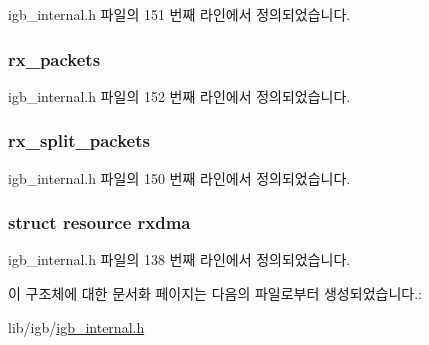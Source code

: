 igb\+\_\+internal.\+h 파일의 151 번째 라인에서 정의되었습니다.

\subsubsection[{\texorpdfstring{rx\+\_\+packets}{rx_packets}}]{ rx\+\_\+packets}\hypertarget{structrx__ring_aa3bebfb174ded875865a321225aa30ac}{}\label{structrx__ring_aa3bebfb174ded875865a321225aa30ac}


igb\+\_\+internal.\+h 파일의 152 번째 라인에서 정의되었습니다.

\subsubsection[{\texorpdfstring{rx\+\_\+split\+\_\+packets}{rx_split_packets}}]{ rx\+\_\+split\+\_\+packets}\hypertarget{structrx__ring_a531d11bd600d2183a8bee4aa70c0652e}{}\label{structrx__ring_a531d11bd600d2183a8bee4aa70c0652e}


igb\+\_\+internal.\+h 파일의 150 번째 라인에서 정의되었습니다.

\subsubsection[{\texorpdfstring{rxdma}{rxdma}}]{\setlength{\rightskip}{0pt plus 5cm}struct {\bf resource} rxdma}\hypertarget{structrx__ring_a7b5f7d41a39b44612fd251f290500ba5}{}\label{structrx__ring_a7b5f7d41a39b44612fd251f290500ba5}


igb\+\_\+internal.\+h 파일의 138 번째 라인에서 정의되었습니다.



이 구조체에 대한 문서화 페이지는 다음의 파일로부터 생성되었습니다.\+:\begin{DoxyCompactItemize}
\item 
lib/igb/\hyperlink{igb__internal_8h}{igb\+\_\+internal.\+h}\end{DoxyCompactItemize}
